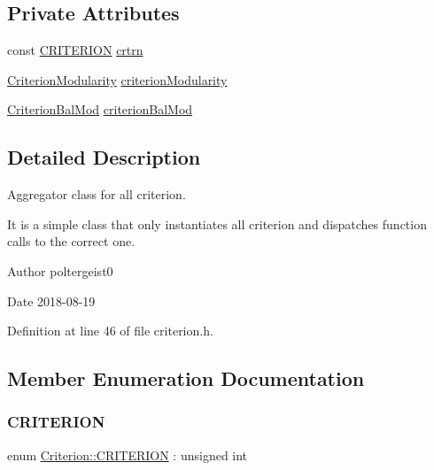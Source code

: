 \subsection*{Private Attributes}
\begin{DoxyCompactItemize}
\item 
const \hyperlink{classCriterion_a55594c223ce0837b8319c46c66cb648f}{C\+R\+I\+T\+E\+R\+I\+ON} \hyperlink{classCriterion_af38092427520b56e2301f14e7fc71dbb}{crtrn}
\item 
\hyperlink{classCriterionModularity}{Criterion\+Modularity} \hyperlink{classCriterion_ae3432ace13d3191c7f6f33c833eb3b82}{criterion\+Modularity}
\item 
\hyperlink{classCriterionBalMod}{Criterion\+Bal\+Mod} \hyperlink{classCriterion_a164dd99a6707997bb916a1516e1cd327}{criterion\+Bal\+Mod}
\end{DoxyCompactItemize}


\subsection{Detailed Description}
Aggregator class for all criterion. 

It is a simple class that only instantiates all criterion and dispatches function calls to the correct one.

\begin{DoxyAuthor}{Author}
poltergeist0
\end{DoxyAuthor}
\begin{DoxyDate}{Date}
2018-\/08-\/19 
\end{DoxyDate}


Definition at line 46 of file criterion.\+h.



\subsection{Member Enumeration Documentation}
\mbox{\label{classCriterion_a55594c223ce0837b8319c46c66cb648f}} 
\subsubsection{\texorpdfstring{C\+R\+I\+T\+E\+R\+I\+ON}{CRITERION}}
{\footnotesize\ttfamily enum \hyperlink{classCriterion_a55594c223ce0837b8319c46c66cb648f}{Criterion\+::\+C\+R\+I\+T\+E\+R\+I\+ON} \+: unsigned int\hspace{0.3cm}{\ttfamily [strong]}}

